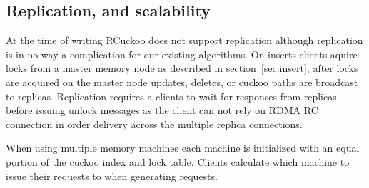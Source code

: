 \subsection{Replication, and scalability} 

 At the time of writing RCuckoo
does not support replication although replication is in no
way a complication for our existing algorithms. On inserts
clients aquire locks from a master memory node as described
in section~\ref{sec:insert}, after locks are acquired on the
master node updates, deletes, or cuckoo paths are broadcast
to replicas. Replication requires a clients to wait for
responses from replicas before issuing unlock messages as
the client can not rely on RDMA RC connection in order
delivery across the multiple replica connections.

 When using
multiple memory machines each machine is initialized with an
equal portion of the cuckoo index and lock table. Clients
calculate which machine to issue their requests to when
generating requests.

